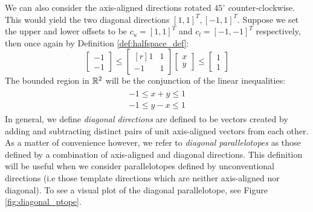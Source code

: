 \begin{example}
  \label{ex:simple_diag_ptope}
  We can also consider the axis-aligned directions rotated $45^\circ$ counter-clockwise. This would yield the two diagonal directions $[1,1]^T, [-1,1]^T$. Suppose we set the upper and lower offsets to be $c_u = [1,1]^T$ and $c_l = [-1,-1]^T$ respectively, then once again by Definition \ref{def:halfspace_def}:
  \begin{equation}
  \begin{bmatrix}
    -1 \\ -1
  \end{bmatrix} \leq \begin{bmatrix*}[r]
      1 & 1 \\ -1 & 1
    \end{bmatrix*}\begin{bmatrix}
     x \\ y
    \end{bmatrix} \leq \begin{bmatrix}
      1 \\ 1
    \end{bmatrix}
  \end{equation}
  The bounded region in ${\mathbb{R}}^2$ will be the conjunction of the linear inequalities:
  \begin{align}
    \begin{split}
    -1 \leq x + y \leq 1 \\
    -1 \leq y - x \leq 1
    \end{split}
  \end{align}
  In general, we define \emph{diagonal directions} are defined to be vectors created by adding and subtracting distinct pairs of unit axis-aligned vectors from each other. As a matter of convenience however, we refer to \emph{diagonal parallelotopes} as those defined by a combination of axis-aligned and diagonal directions. This definition will be useful when we consider parallelotopes defined by unconventional directions (i.e those template directions which are neither axis-aligned nor diagonal). To see a visual plot of the diagonal parallelotope, see Figure \ref{fig:diagonal_ptope}.

  \begin{figure}[h!]
    \centering
\end{figure}
\end{example}
